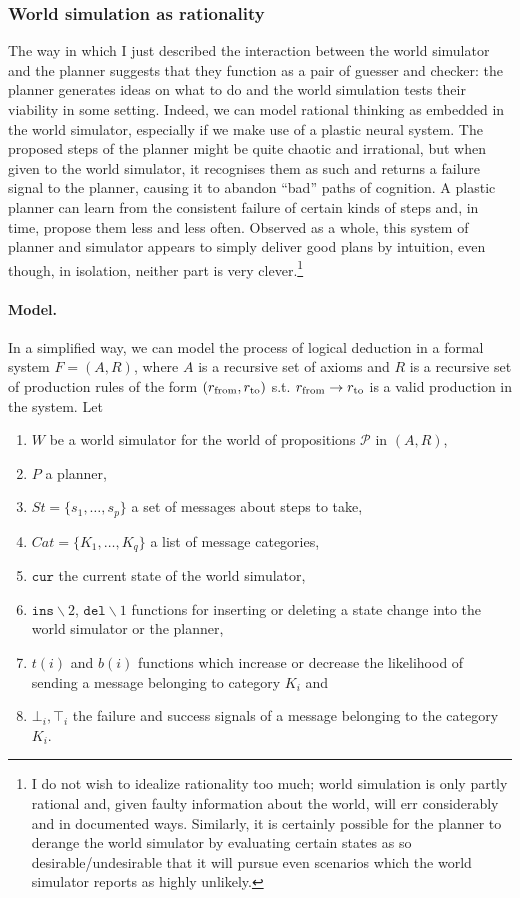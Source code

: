 \documentclass[]{scrartcl}
\theoremstyle{break}
\newcommand{\mt}[1]{\textnormal{#1}}
\renewcommand{\tt}[1]{\texttt{#1}}
\begin{document}
\subsubsection{World simulation as rationality}
The way in which I just described the interaction between the world simulator and the planner suggests that they function as a pair of guesser and checker: the planner generates ideas on what to do and the world simulation tests their viability in some setting. Indeed, we can model rational thinking as embedded in the world simulator, especially if we make use of a plastic neural system. The proposed steps of the planner might be quite chaotic and irrational, but when given to the world simulator, it recognises them as such and returns a failure signal to the planner, causing it to abandon ``bad'' paths of cognition. A plastic planner can learn from the consistent failure of certain kinds of steps and, in time, propose them less and less often. Observed as a whole, this system of planner and simulator appears to simply deliver good plans by intuition, even though, in isolation, neither part is very clever.\footnote{I do not wish to idealize rationality too much; world simulation is only partly rational and, given faulty information about the world, will err considerably and in documented ways. Similarly, it is certainly possible for the planner to derange the world simulator by evaluating certain states as so desirable/undesirable that it will pursue even scenarios which the world simulator reports as highly unlikely.}

\paragraph{Model.} In a simplified way, we can model the process of logical deduction in a formal system $F = (A, R)$, where $A$ is a recursive set of axioms and $R$ is a recursive set of production rules of the form $(r_{\mt{from}}, r_{\mt{to}})$ s.t. $r_{\mt{from}} \rightarrow r_{\mt{to}}$ is a valid production in the system. Let
	\begin{enumerate}
		\item $W$ be a world simulator for the world of propositions $\mathcal{P}$ in $(A,R)$,
		\item $P$ a planner,
		\item $St = \{s_1,\dots,s_p\}$ a set of messages about steps to take,
		\item $Cat = \{K_1,\dots,K_q\}$ a list of message categories,
		\item $\tt{cur}$ the current state of the world simulator,
		\item $\tt{ins}\backslash 2$, $\tt{del}\backslash 1$ functions for inserting or deleting a state change into the world simulator or the planner,
		\item $t(i)$ and $b(i)$ functions which increase or decrease the likelihood of sending a message belonging to category $K_i$ and 
		\item $\bot_{i}, \top_{i}$ the failure and success signals of a message belonging to the category $K_i$.
	\end{enumerate}
	
\end{document}
